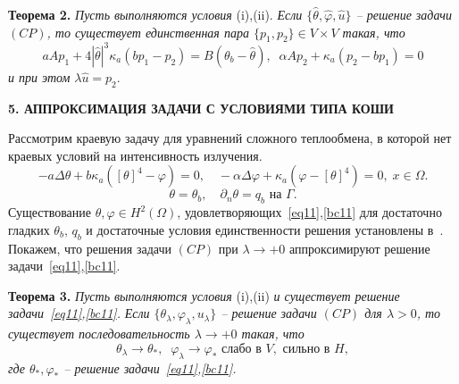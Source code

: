 \documentclass[12pt]{article}
\begin{document}
    \textbf{Теорема 2.}
    {\it
    Пусть выполняются условия} (i),(ii).
        {\it  Если $\{\hat{\theta}, \hat{\varphi}, \hat{u}\}$ -- решение
    задачи $(CP)$, то существует единственная пара $\{p_1, p_2 \} \in V\times V$
        такая, что}
    \begin{equation}
        \label{eq:as}
        aAp_1 +4|\hat{\theta}|^3 \kappa_a(bp_1 - p_2) = B(\theta_b - \hat{\theta}), \;\;
        \alpha A p_2 + \kappa_a (p_2 - b p_1)=0
    \end{equation}
    {\it и при этом} $\lambda\hat{u} = p_2.$




    \begin{center}
        \textbf{5. АППРОКСИМАЦИЯ ЗАДАЧИ С УСЛОВИЯМИ ТИПА КОШИ}
    \end{center}


    Рассмотрим краевую задачу для уравнений сложного теплообмена, в которой нет краевых условий на
    интенсивность излучения.
    \begin{equation}
        \label{eq11}  - a\Delta\theta + b\kappa_a([\theta]^4- \varphi)=0,\quad
        -\alpha \Delta \varphi +
        \kappa_a(\varphi-[\theta]^4)=0,\; x\in\Omega.
    \end{equation}
    \begin{equation}
        \label{bc11} \theta=\theta_b,\quad \partial_n\theta = q_b \text{  на  }\Gamma.
    \end{equation}
    Существование $\theta,\varphi\in H^2(\Omega)$, удовлетворяющих~\eqref{eq11},\eqref{bc11}
    для достаточно гладких
    $\theta_b,\, q_b$ и достаточные условия единственности решения
    установлены в~\cite{CMMP20}.
    Покажем, что решения задачи $(CP)$ при $\lambda\to+0$
    аппроксимируют решение задачи~\eqref{eq11},\eqref{bc11}.


    \textbf{Теорема 3.}
    {\it
    Пусть выполняются условия} (i),(ii) {\it и существует решение задачи~\eqref{eq11},\eqref{bc11}.}
        {\it  Если $\{\theta_\lambda,\varphi_\lambda,u_\lambda\}$ -- решение
    задачи $(CP)$ для $\lambda>0$, то существует последовательность
        $\lambda\to +0$
        такая, что}
    $$
    \theta_\lambda\rightarrow\theta_*, \;\; \varphi_\lambda\rightarrow\varphi_*
    \text{ слабо в }V,\text{ сильно в }H,
    $$
        {\it где $\theta_*,\varphi_*$ -- решение задачи~\eqref{eq11},\eqref{bc11}.}
\end{document}

